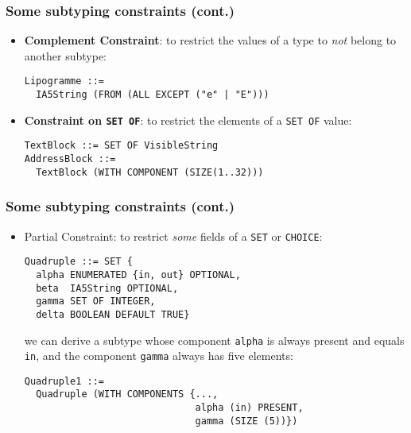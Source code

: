 \documentclass[compress,dvips,xcolor={dvipsnames},t]{beamer}
\begin{document}
\begin{frame}[containsverbatim]
\frametitle{Some subtyping constraints (cont.)}

\begin{itemize}

  \item \textbf{Complement Constraint}: to restrict the values of a
        type to \emph{not} belong to another subtype:

\begin{verbatim}
Lipogramme ::=
  IA5String (FROM (ALL EXCEPT ("e" | "E")))
\end{verbatim}

\bigskip\bigskip

  \item \textbf{Constraint on \texttt{SET OF}}: to restrict the
        elements of a \texttt{SET OF} value:

\begin{verbatim}
TextBlock ::= SET OF VisibleString
AddressBlock ::=
  TextBlock (WITH COMPONENT (SIZE(1..32)))
\end{verbatim}

\end{itemize}

\end{frame}

\begin{frame}[containsverbatim]
\frametitle{Some subtyping constraints (cont.)}

\begin{itemize}
  \item \textsf{Partial Constraint}: to restrict \emph{some} fields
        of a \texttt{SET} or \texttt{CHOICE}:

\begin{verbatim}
Quadruple ::= SET {
  alpha ENUMERATED {in, out} OPTIONAL,
  beta  IA5String OPTIONAL,
  gamma SET OF INTEGER,
  delta BOOLEAN DEFAULT TRUE}
\end{verbatim}

we can derive a subtype whose component \verb+alpha+ is always present
and equals \verb+in+, and the component \verb+gamma+ always has
five elements:
\begin{verbatim}
Quadruple1 ::=
  Quadruple (WITH COMPONENTS {..., 
                              alpha (in) PRESENT,  
                              gamma (SIZE (5))})
\end{verbatim}

\end{itemize}

\end{frame}
\end{document}
